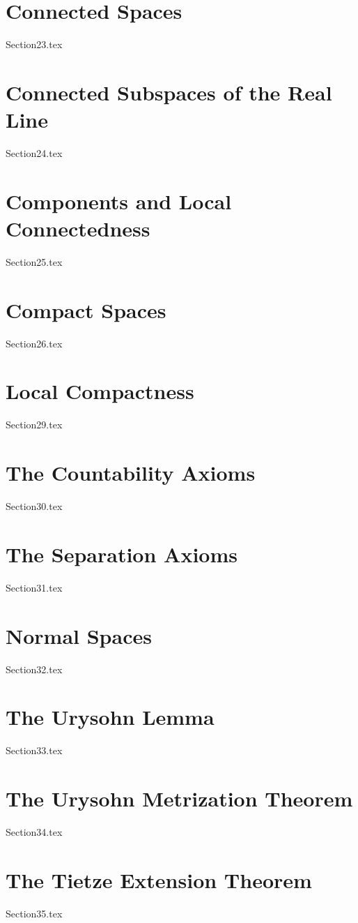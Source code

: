\documentclass[12pt, oneside]{memoir}
\begin{document}
\chapter{Connected Spaces}
{Section23.tex}

\chapter{Connected Subspaces of the Real Line}
{Section24.tex}

\chapter{Components and Local Connectedness}
{Section25.tex}

\chapter{Compact Spaces}
{Section26.tex}

\chapter{Local Compactness}
{Section29.tex}

\chapter{The Countability Axioms}
{Section30.tex}

\chapter{The Separation Axioms}
{Section31.tex}

\chapter{Normal Spaces}
{Section32.tex}

\chapter{The Urysohn Lemma}
{Section33.tex}

\chapter{The Urysohn Metrization Theorem}
{Section34.tex}

\chapter{The Tietze Extension Theorem}
{Section35.tex}
\end{document}
